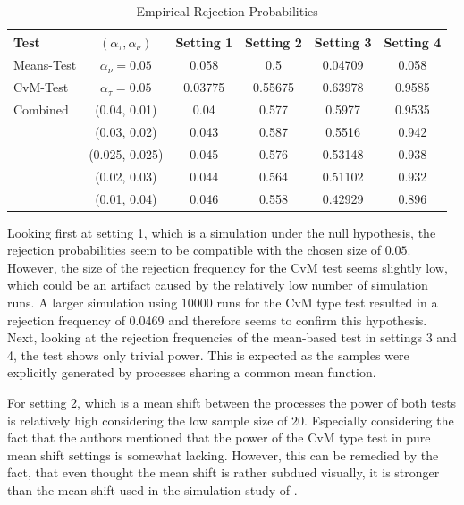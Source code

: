 \documentclass[12pt, a4paper]{article}
\theoremstyle{MAstyle} \newtheorem{assumption}{Assumption}[section]
\theoremstyle{MAstyle} \newtheorem{definition}{Definition}[section]
\theoremstyle{MAstyle} \newtheorem{theorem}{Theorem}[section]
\begin{document}
		\begin{table}[H]
			\centering
			\begin{tabular}{l|c|cccc}\toprule
				\textbf{Test}	&$\left(\alpha_{\tau}, \alpha_{\nu}\right) $ &\textbf{Setting 1} &\textbf{Setting 2}	&\textbf{Setting 3} &\textbf{Setting 4}\\
				\midrule
				Means-Test		&$\alpha_{\nu} = 0.05$	& 0.058		& 0.5  	 	& 0.04709	& 0.058 	\\
				CvM-Test 		&$\alpha_{\tau} = 0.05$	& 0.03775	& 0.55675  	& 0.63978 	& 0.9585	\\
				\midrule	
				Combined		& (0.04, 0.01)			& 0.04		& 0.577  	& 0.5977 	& 0.9535	\\
								& (0.03, 0.02)			& 0.043		& 0.587  	& 0.5516 	& 0.942 	\\
								& (0.025, 0.025)		& 0.045		& 0.576  	& 0.53148 	& 0.938		\\
								& (0.02, 0.03)			& 0.044		& 0.564  	& 0.51102 	& 0.932		\\
								& (0.01, 0.04)			& 0.046		& 0.558  	& 0.42929 	& 0.896		\\
				\bottomrule
			\end{tabular}
			\caption{Empirical Rejection Probabilities}
		\end{table}
		Looking first at setting 1, which is a simulation under the null hypothesis, the rejection probabilities seem to be compatible with the chosen size of $0.05$. However, the size of the rejection frequency for the CvM test seems slightly low, which could be an artifact caused by the relatively low number of simulation runs. A larger simulation using $10000$ runs for the CvM type test resulted in a rejection frequency of 0.0469 and therefore seems to confirm this hypothesis.
		Next, looking at the rejection frequencies of the mean-based test in settings 3 and 4, the test shows only trivial power. This is expected as the samples were explicitly generated by processes sharing a common mean function. 
		
		For setting 2, which is a mean shift between the processes the power of both tests is relatively high considering the low sample size of $20$. Especially considering the fact that the authors mentioned that the power of the CvM type test in pure mean shift settings is somewhat lacking. However, this can be remedied by the fact, that even thought the mean shift is rather subdued visually, it is stronger than the mean shift used in the simulation study of \cite{bugni_permutation_2021}.
		
\end{document}
